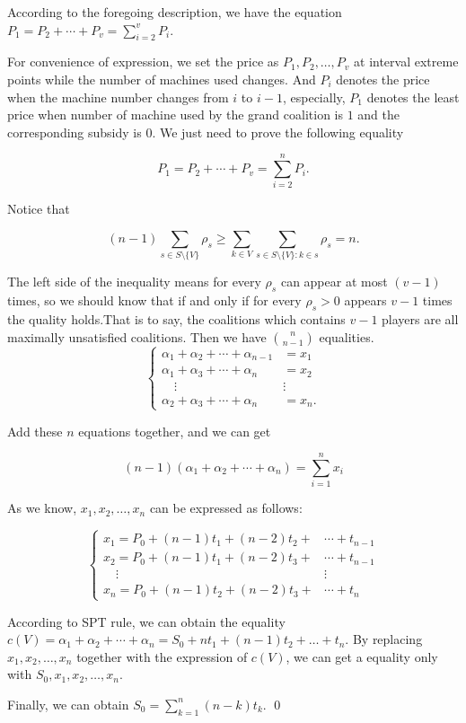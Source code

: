 \begin{pf}[Theorem 2]

According to the foregoing description, we have the equation $P_{1}=P_{2}+\cdots+P_{v}=\sum_{i=2}^v P_i$.

For convenience of expression, we set the price as $P_{1},P_{2}, \dots ,P_{v}$ at interval extreme points while the number of machines used changes.
And $P_{i}$ denotes the price when the machine number changes from $i$ to $i-1$, especially, $P_{1}$ denotes the least price when number of machine used by the grand coalition is $1$ and the corresponding subsidy is $0$.
We just need to prove the following equality

\begin{displaymath}
  P_{1}=P_{2}+\cdots+P_{v}=\sum_{i=2}^n P_i.
\end{displaymath}

Notice that

\begin{displaymath}
  (n-1) \sum_{s \in S \setminus\{V\} } \rho_s \geq
  \sum_{k\in V}\sum_{s \in S \setminus\{V\}:k \in s} \rho_s = n.
\end{displaymath}

The left side of the inequality means for every $\rho_s$ can appear at most $(v-1)$ times, so we should know that if and only if for every $\rho_s > 0$ appears $v-1$ times the quality holds.That is to say, the coalitions which contains $v-1$ players are all maximally unsatisfied coalitions. Then we have $n \choose n-1$ equalities.
\[
\begin{cases}
 \alpha_1+\alpha_2+ \cdots+\alpha_{n-1} & = x_1 \\
 \alpha_1+\alpha_3+ \cdots+\alpha_n & = x_2 \\
 \quad   \vdots        &\vdots\\
 \alpha_2+\alpha_3+ \cdots+\alpha_n & = x_n.
\end{cases}
\]

Add these $n$ equations together, and we can get

\begin{equation*}
  (n-1)(\alpha_1+\alpha_2+ \cdots+\alpha_n)=\sum_{i=1}^{n}x_i
\end{equation*}

As we know, $x_1,x_2,\dots,x_n$ can be expressed as follows:

\[
\begin{cases}
x_1 = P_0 + (n-1)t_1 + (n-2)t_2 + &\cdots + t_{n-1} \\
x_2 = P_0 + (n-1)t_1 + (n-2)t_3 + &\cdots + t_{n-1} \\
\quad   \vdots        &\vdots\\
x_n = P_0 + (n-1)t_2 + (n-2)t_3 + &\cdots + t_{n}
\end{cases}
\]

According to SPT rule, we can obtain the equality
$c(V)=\alpha_1+\alpha_2+\cdots+\alpha_n=S_0+nt_1+(n-1)t_2+\dots+t_n$.
By replacing $x_1,x_2,\dots,x_n$ together with the expression of $c(V)$, we can get a equality only with $S_0,x_1,x_2,\dots,x_n$.

Finally, we can obtain $S_0 = \sum_{k=1}^n (n-k)t_k$.
\qed
\end{pf}


